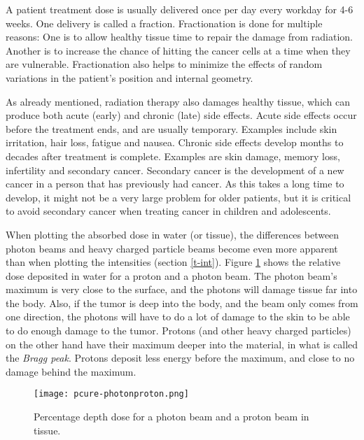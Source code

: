 \documentclass[../main/thesis.tex]{subfiles}
\begin{document}
A patient treatment dose is usually delivered once per day every workday for 4-6 weeks. One delivery is called a fraction. Fractionation is done for multiple reasons: One is to allow healthy tissue time to repair the damage from radiation. Another is to increase the chance of hitting the cancer cells at a time when they are vulnerable. Fractionation also helps to minimize the effects of random variations in the patient's position and internal geometry. \citep{fractionation} \citep{hysing-uncertain}

As already mentioned, radiation therapy also damages healthy tissue, which can produce both acute (early) and chronic (late) side effects. Acute side effects occur before the treatment ends, and are usually temporary. Examples include skin irritation, hair loss, fatigue and nausea. Chronic side effects develop months to decades after treatment is complete. Examples are skin damage, memory loss, infertility and secondary cancer. Secondary cancer is the development of a new cancer in a person that has previously had cancer. As this takes a long time to develop, it might not be a very large problem for older patients, but it is critical to avoid secondary cancer when treating cancer in children and adolescents. \citep{nih} 

When plotting the absorbed dose in water (or tissue), the differences between photon beams and heavy charged particle beams become even more apparent than when plotting the intensities (section \ref{t-int}). Figure \ref{fig-photonproton} shows the relative dose deposited in water for a proton and a photon beam. The photon beam's maximum is very close to the surface, and the photons will damage tissue far into the body. Also, if the tumor is deep into the body, and the beam only comes from one direction, the photons will have to do a lot of damage to the skin to be able to do enough damage to the tumor. Protons (and other heavy charged particles) on the other hand have their maximum deeper into the material, in what is called the \textit{Bragg peak}. Protons deposit less energy before the maximum, and close to no damage behind the maximum. 

\begin{figure}[h]
	\centering
	\texttt{[image: pcure-photonproton.png]}
	\caption{Percentage depth dose for a photon beam and a proton beam in tissue. \citetext{\citeauthor{pcure}}}
	\label{fig-photonproton}
\end{figure}
\end{document}
